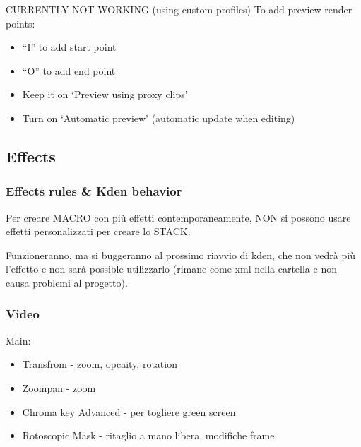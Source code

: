 \documentclass[12pt]{article}
\begin{document}
CURRENTLY NOT WORKING (using custom profiles)
To add preview render points:
\begin{itemize}
    \item ``I'' to add start point
    \item ``O'' to add end point  
    \item Keep it on `Preview using proxy clips'
    \item Turn on `Automatic preview' (automatic update when editing)
\end{itemize}









\clearpage{}
\subsection{Effects}

\vspace{10px}

\subsubsection{Effects rules \& Kden behavior}
\begin{center}
    Per creare MACRO con più effetti contemporaneamente, {\color{red}NON} si possono usare effetti personalizzati per creare lo STACK.    
\end{center}
Funzioneranno, ma si buggeranno al prossimo riavvio di kden, che non vedrà più l'effetto e non sarà possible utilizzarlo (rimane come xml nella cartella e non causa problemi al progetto).



\vspace{20px}



\subsubsection{Video}

Main:
\begin{itemize}
    \item Transfrom - zoom, opcaity, rotation
    \item Zoompan - zoom
    \item Chroma key Advanced - per togliere green screen
    \item Rotoscopic Mask -  ritaglio a mano libera, modifiche frame 
\end{itemize}
\end{document}
